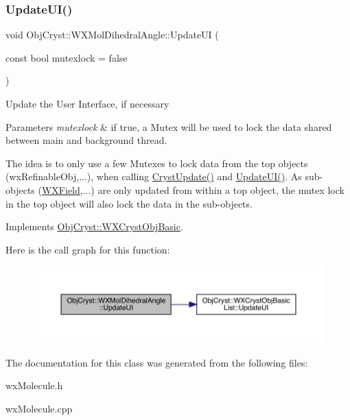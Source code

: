 \subsubsection{\texorpdfstring{UpdateUI()}{UpdateUI()}}
{\footnotesize\ttfamily void Obj\+Cryst\+::\+W\+X\+Mol\+Dihedral\+Angle\+::\+Update\+UI (\begin{DoxyParamCaption}\item[{const bool}]{mutexlock = {\ttfamily false} }\end{DoxyParamCaption})\hspace{0.3cm}{\ttfamily [virtual]}}

Update the User Interface, if necessary


\begin{DoxyParams}{Parameters}
{\em mutexlock} & if true, a Mutex will be used to lock the data shared between main and background thread.\\
\hline
\end{DoxyParams}
The idea is to only use a few Mutexes to lock data from the top objects (wx\+Refinable\+Obj,...), when calling \mbox{\hyperlink{class_obj_cryst_1_1_w_x_mol_dihedral_angle_a5bd5d650acff2a6a749bab3842044b02}{Cryst\+Update()}} and \mbox{\hyperlink{class_obj_cryst_1_1_w_x_mol_dihedral_angle_a6c959c830c79de8bdc253088c5593b5f}{Update\+U\+I()}}. As sub-\/objects (\mbox{\hyperlink{class_obj_cryst_1_1_w_x_field}{W\+X\+Field}},...) are only updated from within a top object, the mutex lock in the top object will also lock the data in the sub-\/objects. 

Implements \mbox{\hyperlink{class_obj_cryst_1_1_w_x_cryst_obj_basic_a3818940b7031ff7e45cf2178c4a99c90}{Obj\+Cryst\+::\+W\+X\+Cryst\+Obj\+Basic}}.

Here is the call graph for this function\+:
\nopagebreak
\begin{figure}[H]
\begin{center}
\leavevmode
\includegraphics[width=350pt]{class_obj_cryst_1_1_w_x_mol_dihedral_angle_a6c959c830c79de8bdc253088c5593b5f_cgraph}
\end{center}
\end{figure}


The documentation for this class was generated from the following files\+:\begin{DoxyCompactItemize}
\item 
wx\+Molecule.\+h\item 
wx\+Molecule.\+cpp\end{DoxyCompactItemize}
